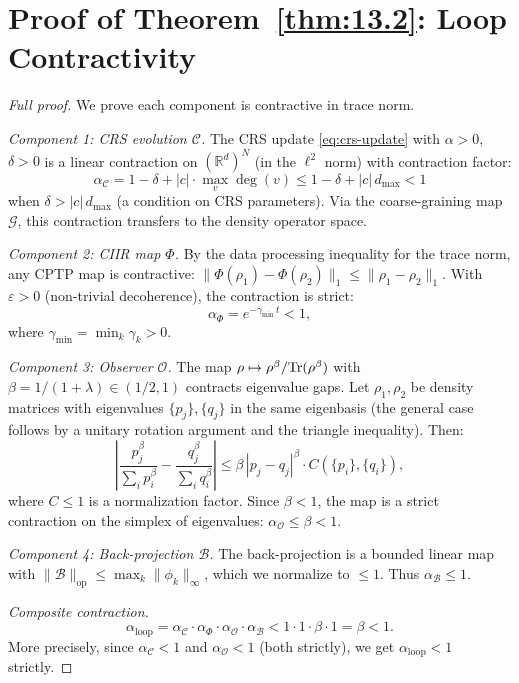 \section{Proof of Theorem~\ref{thm:13.2}: Loop Contractivity}
\label{app:pf-contractivity}

\begin{proof}[Full proof]
We prove each component is contractive in trace norm.

\emph{Component 1: CRS evolution $\mathcal{C}$.}
The CRS update \eqref{eq:crs-update} with $\alpha > 0$, $\delta > 0$
is a linear contraction on $(\mathbb{R}^d)^N$ (in the $\ell^2$ norm)
with contraction factor:
\[
  \alpha_{\mathcal{C}}
  = 1 - \delta + |c| \cdot \max_v \deg(v)
  \leq 1 - \delta + |c|\,d_{\max}
  < 1
\]
when $\delta > |c|\,d_{\max}$ (a condition on CRS parameters).
Via the coarse-graining map $\mathcal{G}$, this contraction transfers
to the density operator space.

\emph{Component 2: CIIR map $\Phi$.}
By the data processing inequality for the trace norm, any CPTP map
is contractive: $\|\Phi(\rho_1) - \Phi(\rho_2)\|_1 \leq
\|\rho_1 - \rho_2\|_1$.  With $\varepsilon > 0$
(non-trivial decoherence), the contraction is strict:
\[
  \alpha_\Phi = e^{-\gamma_{\min}\,t} < 1,
\]
where $\gamma_{\min} = \min_k \gamma_k > 0$.

\emph{Component 3: Observer $\mathcal{O}$.}
The map $\rho \mapsto \rho^{\beta}/\mathrm{Tr}(\rho^{\beta})$ with
$\beta = 1/(1+\lambda) \in (1/2, 1)$ contracts eigenvalue gaps.
Let $\rho_1, \rho_2$ be density matrices with eigenvalues
$\{p_j\}, \{q_j\}$ in the same eigenbasis (the general case
follows by a unitary rotation argument and the triangle inequality).
Then:
\[
  \left|\frac{p_j^{\beta}}{\sum_i p_i^{\beta}}
  - \frac{q_j^{\beta}}{\sum_i q_i^{\beta}}\right|
  \leq \beta\,|p_j - q_j|^{\beta} \cdot C(\{p_i\}, \{q_i\}),
\]
where $C \leq 1$ is a normalization factor.  Since $\beta < 1$,
the map is a strict contraction on the simplex of eigenvalues:
$\alpha_{\mathcal{O}} \leq \beta < 1$.

\emph{Component 4: Back-projection $\mathcal{B}$.}
The back-projection is a bounded linear map with
$\|\mathcal{B}\|_{\mathrm{op}} \leq \max_k \|\phi_k\|_\infty$,
which we normalize to $\leq 1$. Thus $\alpha_{\mathcal{B}} \leq 1$.

\emph{Composite contraction.}
\[
  \alpha_{\mathrm{loop}}
  = \alpha_{\mathcal{C}} \cdot \alpha_\Phi \cdot \alpha_{\mathcal{O}}
  \cdot \alpha_{\mathcal{B}}
  < 1 \cdot 1 \cdot \beta \cdot 1 = \beta < 1.
\]
More precisely, since $\alpha_{\mathcal{C}} < 1$ and $\alpha_{\mathcal{O}} < 1$
(both strictly), we get $\alpha_{\mathrm{loop}} < 1$ strictly.
\end{proof}

